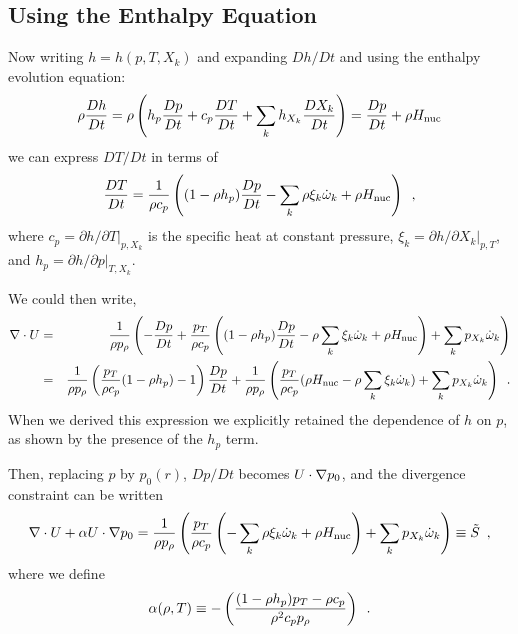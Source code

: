 \subsection{Using the Enthalpy Equation}

Now writing $h = h(p,T,X_k)$ and expanding $Dh/Dt$ and using the enthalpy evolution equation:
\begin{equation}
\rho \frac{D h}{Dt}  = \rho \left( h_p \frac{D p}{Dt} + c_p \frac{D T}{Dt} + \sum_k h_{X_k} \frac{D X_k}{Dt} \right)
                     = \frac{D p}{D t} + \rho {H_{\rm nuc}}
\end{equation}
we can express $DT/Dt$ in terms of 
\begin{equation}
\frac{DT}{Dt} = \frac{1}{\rho c_p} \left( (1 - \rho h_p) \frac{D p}{D t}
- \sum_k \rho \xi_k \dot{\omega}_k + \rho {H_{\rm nuc}} \right) \enskip , \label{eq:dTdt}
\end{equation}
where $c_p = \left.\partial h/\partial T\right|_{p,X_k}$ is the
specific heat at constant pressure,
$\xi_k = \left.\partial h/\partial X_k \right|_{p,T}$,
and $h_p = \left.\partial h/\partial p\right|_{T,X_k}.$

We could then write,
\begin{eqnarray*}
\nabla \cdot U &=& \frac{1}{\rho p_\rho} \left(
- \frac{D p}{D t} + \frac{p_T}{\rho c_p}
  \left( (1 - \rho h_p) \frac{D p}{D t} - \rho \sum_k \xi_k \dot{\omega}_k + \rho {H_{\rm nuc}} \right)
+ \sum_k p_{X_k} \dot{\omega}_k \right)  \\
                 &=& \frac{1}{\rho p_\rho}
  \left( \frac{p_T}{\rho c_p}(1  - \rho h_p) - 1 \right) \frac{D p}{D t}
 + \frac{1}{\rho p_\rho} \left(
  \frac{p_T}{\rho c_p} (\rho {H_{\rm nuc}} - \rho \sum_k \xi_k   \dot{\omega}_k)
                               + \sum_k p_{X_k} \dot{\omega}_k \right) \enskip .
\end{eqnarray*}
When we derived this expression we explicitly retained the dependence of $h$ on $p$,
as shown by the presence of the $h_p$ term.   

Then, replacing $p$ by $p_0(r)$, $Dp/Dt$ becomes $U \cdot
\nabla p_0$, and the divergence constraint can be written
\begin{equation}
\nabla \cdot U + \alpha U \cdot \nabla p_0 =
\frac{1}{\rho p_\rho} \left(
   \frac{p_T}{\rho c_p} \left(
  - \sum_k\rho  \xi_k \dot{\omega}_k + \rho {H_{\rm nuc}} \right)
 + \sum_k p_{X_k} \dot{\omega}_k \right)  \equiv \tilde{S} \enskip \label{eq:full_divu_constraint} ,
\end{equation}
where we define
\begin{equation}
\alpha(\rho,T) \equiv - \left( \frac{(1 - \rho h_p )p_T - \rho c_p}{\rho^2
  c_p p_\rho} \right) \enskip . \label{eq:alphadef}
\end{equation}

